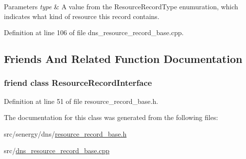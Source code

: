 \begin{DoxyParams}{Parameters}
{\em type} & A value from the Resource\-Record\-Type enumuration, which indicates what kind of resource this record contains. \\
\hline
\end{DoxyParams}


Definition at line 106 of file dns\-\_\-resource\-\_\-record\-\_\-base.\-cpp.



\subsection{Friends And Related Function Documentation}
\hypertarget{class_senergy_1_1_dns_1_1_resource_record_base_a33acbda019abea688a25ca962f4b7815}{
\subsubsection[{Resource\-Record\-Interface}]{\setlength{\rightskip}{0pt plus 5cm}friend class {\bf Resource\-Record\-Interface}\hspace{0.3cm}{\ttfamily [friend]}}}\label{class_senergy_1_1_dns_1_1_resource_record_base_a33acbda019abea688a25ca962f4b7815}


Definition at line 51 of file resource\-\_\-record\-\_\-base.\-h.



The documentation for this class was generated from the following files\-:\begin{DoxyCompactItemize}
\item 
src/senergy/dns/\hyperlink{resource__record__base_8h}{resource\-\_\-record\-\_\-base.\-h}\item 
src/\hyperlink{dns__resource__record__base_8cpp}{dns\-\_\-resource\-\_\-record\-\_\-base.\-cpp}\end{DoxyCompactItemize}
